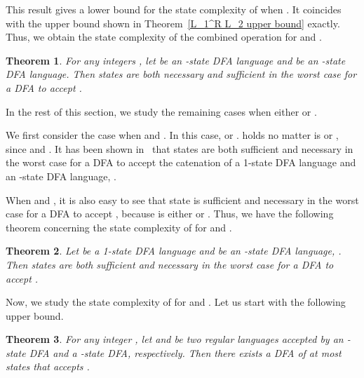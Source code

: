 \documentclass[10pt]{article}
\newtheorem{theorem}{Theorem}
\begin{document}
This result gives a lower bound for the state complexity of
 when . It coincides with the upper bound shown
in Theorem~\ref{L_1^R L_2 upper bound} exactly. Thus, we obtain the
state complexity of the combined operation  for 
and .
\begin{theorem}
\label{L_1^R L_2 state complexity} For any integers ,
let  be an -state DFA language and  be an -state DFA
language. Then  states are both necessary and
sufficient in the worst case for a DFA to accept .
\end{theorem}



In the rest of this section, we study the remaining cases when
either  or .

We first consider the case when  and . In this case,
 or .  holds no matter
 is  or , since 
and . It has been shown in~\cite{YuZhSa94}
that  states are both sufficient and necessary in the worst
case for a DFA to accept the catenation of a 1-state DFA language
and an -state DFA language, .

When  and , it is also easy to see that  state is
sufficient and necessary in the worst case for a DFA to accept
, because  is either  or .
Thus, we have the following theorem concerning the state complexity
of  for  and .



\begin{theorem}
\label{L_1^R L_2 state complexity m=1 n>=1} Let  be a 1-state
DFA language and  be an -state DFA language, . Then
 states are both sufficient and necessary in the worst case
for a DFA to accept .
\end{theorem}

Now, we study the state complexity of  for  and
. Let us start with the following upper bound.

\begin{theorem}
\label{L_1^R L_2 upper bound m>=2 n=1} For any integer , let
 and  be two regular languages accepted by an -state
DFA and a -state DFA, respectively. Then there exists a DFA of at
most  states that accepts .
\end{theorem}
\end{document}
